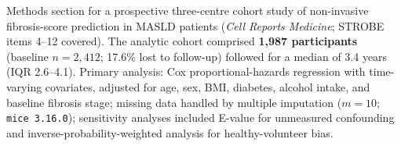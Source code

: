 \caption{Methods section for a prospective three-centre cohort study of non-invasive fibrosis-score prediction in \textsc{MASLD} patients (\textit{Cell Reports Medicine}; STROBE items 4--12 covered). The analytic cohort comprised \textbf{1{,}987 participants} (baseline $n = 2{,}412$; 17.6\% lost to follow-up) followed for a median of 3.4 years (IQR 2.6--4.1). Primary analysis: Cox proportional-hazards regression with time-varying covariates, adjusted for age, sex, BMI, diabetes, alcohol intake, and baseline fibrosis stage; missing data handled by multiple imputation ($m = 10$; \texttt{mice~3.16.0}); sensitivity analyses included E-value for unmeasured confounding and inverse-probability-weighted analysis for healthy-volunteer bias.}
